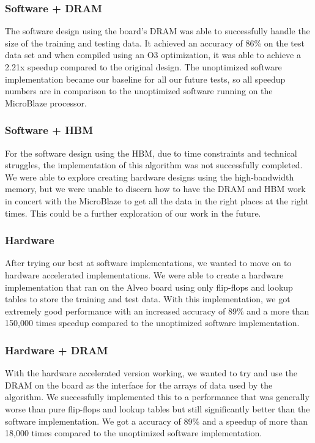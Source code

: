 \documentclass[11pt, final, conference, letterpaper, twocolumn]{IEEEtran}[2015/08/26]
\begin{document}
\subsubsection{Software + DRAM}

The software design using the board's DRAM was able to successfully handle the size of the training and testing data.
It achieved an accuracy of 86\% on the test data set and when compiled using an O3 optimization, it was able to achieve a 2.21x speedup compared to the original design. The unoptimized software implementation became our baseline for all our future tests, so all speedup numbers are in comparison to the unoptimized software running on the MicroBlaze processor.

\subsubsection{Software + HBM}

For the software design using the HBM, due to time constraints and technical struggles, the implementation of this algorithm was not successfully completed. We were able to explore creating hardware designs using the high-bandwidth memory, but we were unable to discern how to have the DRAM and HBM work in concert with the MicroBlaze to get all the data in the right places at the right times. This could be a further exploration of our work in the future.

\subsubsection{Hardware}

After trying our best at software implementations, we wanted to move on to hardware accelerated implementations. We were able to create a hardware implementation that ran on the Alveo board using only flip-flops and lookup tables to store the training and test data. With this implementation, we got extremely good performance with an increased accuracy of 89\% and a more than 150,000 times speedup compared to the unoptimized software implementation.

\subsubsection{Hardware + DRAM}

With the hardware accelerated version working, we wanted to try and use the DRAM on the board as the interface for the arrays of data used by the algorithm. We successfully implemented this to a performance that was generally worse than pure flip-flops and lookup tables but still significantly better than the software implementation. We got a accuracy of 89\% and a speedup of more than 18,000 times compared to the unoptimized software implementation.
\end{document}
